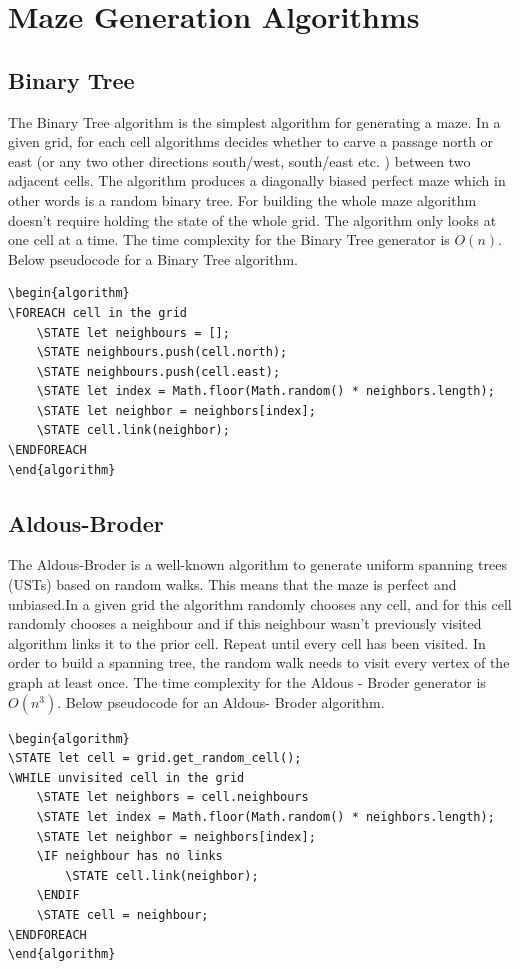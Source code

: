  \section{Maze Generation Algorithms}
\subsection{Binary Tree}
The Binary Tree algorithm is the simplest algorithm for generating a maze. In a given grid, for each cell algorithms decides whether to carve a passage north or east (or any two other directions south/west, south/east etc. ) between two adjacent cells. The algorithm produces a diagonally biased perfect maze which in other words is a random binary tree. For building the whole maze algorithm doesn't require holding the state of the whole grid. The algorithm only looks at one cell at a time. The time complexity for the Binary Tree generator is $O(n)$. Below pseudocode for a Binary Tree algorithm.
\begin{lstlisting}[caption={Pseudocode for a Binary Tree Algorithm}]
\begin{algorithm}
\FOREACH cell in the grid
	\STATE let neighbours = [];
	\STATE neighbours.push(cell.north);
	\STATE neighbours.push(cell.east);
	\STATE let index = Math.floor(Math.random() * neighbors.length);
	\STATE let neighbor = neighbors[index];
	\STATE cell.link(neighbor);
\ENDFOREACH	
\end{algorithm}
\end{lstlisting}
\subsection{Aldous-Broder}
The Aldous-Broder is a well-known algorithm to generate uniform spanning trees (USTs) based on random walks. This means that the maze is perfect and unbiased.\cite{4}In a given grid the algorithm randomly chooses any cell, and for this cell randomly chooses a neighbour and if this neighbour wasn't previously visited algorithm links it to the prior cell. Repeat until every cell has been visited. In order to build a spanning tree, the random walk needs to visit every vertex of the graph at least once. The time complexity for the Aldous - Broder generator is $O(n^3)$. Below pseudocode for an Aldous- Broder algorithm.
\begin{lstlisting}[caption={Pseudocode for a Aldous-Broder algorithm}]
\begin{algorithm}
\STATE let cell = grid.get_random_cell();
\WHILE unvisited cell in the grid
	\STATE let neighbors = cell.neighbours
	\STATE let index = Math.floor(Math.random() * neighbors.length);
	\STATE let neighbor = neighbors[index];
	\IF neighbour has no links
		\STATE cell.link(neighbor);
	\ENDIF
	\STATE cell = neighbour;
\ENDFOREACH
\end{algorithm}
\end{lstlisting}
